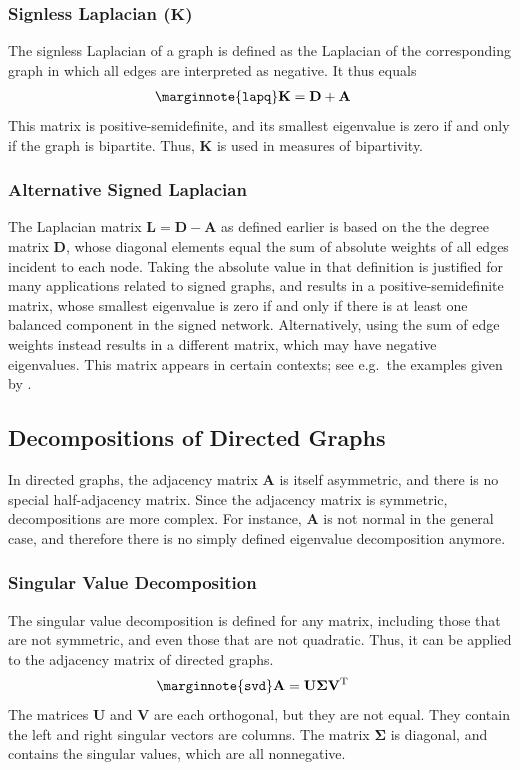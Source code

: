 \documentclass{article}
\begin{document}
\subsubsection{Signless Laplacian ($\mathbf K$)}
The signless Laplacian of a graph is defined as the Laplacian of the
corresponding graph in which all edges are interpreted as negative.  It
thus equals
\begin{align}
  \marginnote{\texttt{lapq}}
  \mathbf K &= \mathbf D + \mathbf A
\end{align}
This matrix is positive-semidefinite, and its smallest eigenvalue is
zero if and only if the graph is bipartite.  Thus, $\mathbf K$ is used
in measures of bipartivity. 

\subsubsection{Alternative Signed Laplacian}
The Laplacian matrix $\mathbf L = \mathbf D - \mathbf A$ as defined
earlier is based on the the degree matrix $\mathbf D$, whose diagonal
elements equal the sum of absolute weights of all edges incident to each
node.  
Taking the absolute value in that definition is justified for
many applications related to signed graphs, and results in a positive-semidefinite matrix, whose
smallest eigenvalue is zero if and only if there is at least one
balanced component in the signed network.  Alternatively, using the sum
of edge weights instead results in a different matrix, which may have
negative eigenvalues.  This matrix appears in certain contexts; see
e.g.\ the examples given by \cite{b875}. 

\subsection{Decompositions of Directed Graphs}
In directed graphs, the adjacency matrix $\mathbf A$ is itself
asymmetric, and there is no special half-adjacency matrix.  Since the
adjacency matrix is symmetric, decompositions are more complex.  For
instance, $\mathbf A$ is not normal in the general case, and therefore
there is no simply defined eigenvalue decomposition anymore. 

\subsubsection{Singular Value Decomposition}
The singular value decomposition is defined for any matrix, including
those that are not symmetric, and even those that are not quadratic.
Thus, it can be applied to the adjacency matrix of directed graphs. 
\begin{align}
  \marginnote{\texttt{svd}}
  \mathbf A &= \mathbf U \mathbf \Sigma \mathbf V^{\mathrm T}
\end{align}
The matrices $\mathbf U$ and $\mathbf V$ are each orthogonal, but they
are not equal.  They contain the left and right singular vectors are
columns.  The matrix $\mathbf \Sigma$ is diagonal, and contains the
singular values, which are all nonnegative. 
\end{document}
